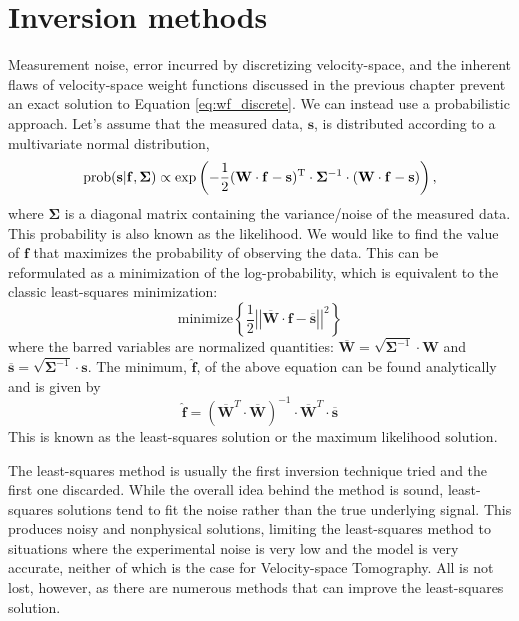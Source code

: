 \section{Inversion methods}\label{sec:methods}
Measurement noise, error incurred by discretizing velocity-space, and the inherent flaws of velocity-space weight functions discussed in the previous chapter prevent an exact solution to Equation \ref{eq:wf_discrete}. We can instead use a probabilistic approach. Let's assume that the measured data, $\mathbf{s}$, is distributed according to a multivariate normal distribution,
\begin{equation}\label{eq:likelihood}
    \rm{prob}(\mathbf{s}|\mathbf{f},\mathbf{\Sigma}) \propto \exp{\left(-\frac{1}{2} (\mathbf{W}\cdot\mathbf{f} - \mathbf{s})^T \cdot \mathbf{\Sigma}^{-1} \cdot (\mathbf{W}\cdot\mathbf{f} - \mathbf{s})\right)}\,,
\end{equation}
where $\mathbf{\Sigma}$ is a diagonal matrix containing the variance/noise of the measured data. This probability is also known as the likelihood. We would like to find the value of $\mathbf{f}$ that maximizes the probability of observing the data. This can be reformulated as a minimization of the log-probability, which is equivalent to the classic least-squares minimization:
\begin{equation}\label{eq:least_squares}
    \mathrm{minimize} \left \lbrace \frac{1}{2}\left|\left| \mathbf{\overline{W}}\cdot\mathbf{f} - \mathbf{\overline{s}}\right|\right|^2 \right \rbrace 
\end{equation}
where the barred variables are normalized quantities: $\mathbf{\overline{W}} = \sqrt{\mathbf{\Sigma}^{-1}}\cdot\mathbf{W}$ and $\mathbf{\overline{s}}=\sqrt{\mathbf{\Sigma}^{-1}}\cdot\mathbf{s}$.
The minimum, $\mathbf{\hat{f}}$, of the above equation can be found analytically and is given by
\begin{equation}\label{eq:least_squares_solution}
    \mathbf{\hat{f}} = \left(\mathbf{\overline{W}}^T\cdot\mathbf{\overline{W}}\right)^{-1}\cdot\mathbf{\overline{W}}^T \cdot \mathbf{\overline{s}}
\end{equation}
This is known as the least-squares solution or the maximum likelihood solution.

The least-squares method is usually the first inversion technique tried and the first one discarded. While the overall idea behind the method is sound, least-squares solutions tend to fit the noise rather than the true underlying signal. This produces noisy and nonphysical solutions, limiting the least-squares method to situations where the experimental noise is very low and the model is very accurate, neither of which is the case for Velocity-space Tomography.
All is not lost, however, as there are numerous methods that can improve the least-squares solution.   

